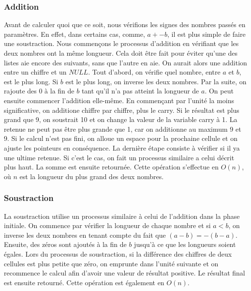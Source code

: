 \documentclass[letterpaper,12pt]{scrartcl}
\begin{document}
            \subsubsection{Addition}
             Avant de calculer quoi que ce soit, nous vérifions les signes des nombres passés en paramètres. En effet, dans certains cas, comme, $a + -b$, il est plus simple de faire une soustraction. Nous commençons le processus d'addition en vérifiant que les deux nombres ont la même longueur. Cela doit être fait pour éviter qu'une des listes aie encore des suivants, sans que l'autre en aie. On aurait alors une addition entre un chiffre et un $NULL$. Tout d'abord, on vérifie quel nombre, entre $a$ et $b$, est le plus long. Si $b$ est le plus long, on inverse les deux nombres. Par la suite, on rajoute des 0 à la fin de $b$ tant qu'il n'a pas atteint la longueur de $a$. On peut ensuite commencer l'addition elle-même. En commençant par l'unité la moins significative, on additione chiffre par chiffre, plus le carry. Si le résultat est plus grand que 9, on soustrait 10 et on change la valeur de la variable carry à 1. La retenue ne peut pas être plus grande que 1, car on additionne au maximum 9 et 9. Si le calcul n'est pas fini, on alloue un espace pour la prochaine cellule et on ajuste les pointeurs en conséquence. La dernière étape consiste à vérifier si il ya une ultime retenue. Si c'est le cas, on fait un processus similaire a celui décrit plus haut. La somme est ensuite retournée. Cette opération s'effectue en $O(n)$, où $n$ est la longueur du plus grand des deux nombres.
            
            \subsubsection{Soustraction}
             La soustraction utilise un processus similaire à celui de l'addition dans la phase initiale. On commence par vérifier la longueur de chaque nombre et si $a < b$, on inverse les deux nombres en tenant compte du fait que $(a-b) = -(b-a)$. Ensuite, des zéros sont ajoutés à la fin de $b$ jusqu'à ce que les longueurs soient égales. Lors du processus de soustraction, si la différence des chiffres de deux cellules est plus petite que zéro, on emprunte dans l'unité suivante et on recommence le calcul afin d'avoir une valeur de résultat positive. Le résultat final est ensuite retourné. Cette opération est également en $O(n)$.
            
\end{document}

